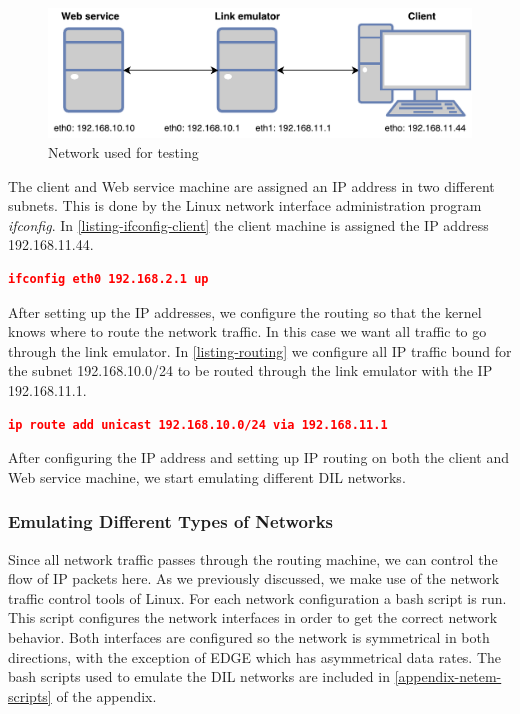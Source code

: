 \begin{figure}[h]
\includegraphics[scale=0.73]{images/testing_environment.pdf}
\caption{Network used for testing}
\label{figure-testing-environment}
\end{figure}

The client and Web service machine are assigned an IP address in two different
subnets. This is done by the Linux network interface administration program
\textit{ifconfig}. In \cref{listing-ifconfig-client} the client machine is
assigned the IP address 192.168.11.44.

\begin{lstlisting}[frame=single, language=json, caption="Setting the IP address a network interface", label=listing-ifconfig-client]
ifconfig eth0 192.168.2.1 up
\end{lstlisting}

After setting up the IP addresses, we configure the routing so that the kernel
knows where to route the network traffic. In this case we want all traffic to go
through the link emulator. In \cref{listing-routing} we configure all IP traffic
bound for the subnet 192.168.10.0/24 to be routed through the link emulator with
the IP 192.168.11.1.

\begin{lstlisting}[frame=single, language=json, caption="Configuring routing rules", label=listing-routing]
ip route add unicast 192.168.10.0/24 via 192.168.11.1
\end{lstlisting}

After configuring the IP address and setting up IP routing on both the client
and Web service machine, we start emulating different DIL networks.

\subsubsection{Emulating Different Types of Networks}

Since all network traffic passes through the routing machine, we can control the
flow of IP packets here. As we previously discussed, we make use of the network
traffic control tools of Linux. For each network configuration a bash script is
run. This script configures the network interfaces in order to get the correct
network behavior. Both interfaces are configured so the network is symmetrical
in both directions, with the exception of EDGE which has asymmetrical data
rates. The bash scripts used to emulate the DIL networks are included in
\cref{appendix-netem-scripts} of the appendix.


